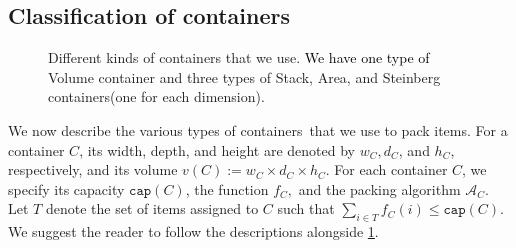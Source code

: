 \documentclass[10pt,a4paper]{amsart}
\newcommand{\kvnnew}[1]{\textcolor{black}{#1}}
\newcommand{\kvnr}[1]{}
\newcommand{\akr}[1]{}
\newcommand{\AM}{\mathcal{A}}
\newcommand{\boxes}{containers\xspace}
\theoremstyle{definition}
\begin{document}
\subsection{Classification of \boxes}
\label{sec:cont-class}

\begin{figure}
    \centering
    
    \caption{Different kinds of \boxes that we use. \kvnnew{We have one type of} Volume container and three types of Stack, Area, and Steinberg \boxes (one for each dimension).}
    \label{fig:large-stack-containers}
\end{figure}

We now describe the various types of \boxes\ that we use to pack items. For a container $C$, its width, depth, and height are denoted by $w_C, d_C$, and $h_C$, respectively, and its volume $v(C) := w_C \times d_C \times h_C$.
For each container $C$, we specify its capacity $\mathtt{cap}(C)$, the function $f_C,$ and the packing algorithm $\AM_C$.
Let $T$ denote the set of items assigned to $C$ such that $\sum_{i\in T}f_C(i)\le \mathtt{cap}(C)$.
We suggest the reader to follow the descriptions alongside \cref{fig:large-stack-containers}.
\end{document}
